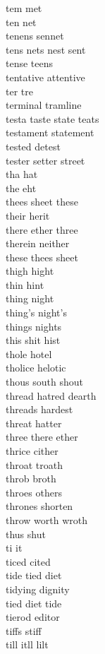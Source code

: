 tem met\\
ten net\\
tenens sennet\\
tens nets nest sent\\
tense teens\\
tentative attentive\\
ter tre\\
terminal tramline\\
testa taste state teats\\
testament statement\\
tested detest\\
tester setter street\\
tha hat\\
the eht\\
thees sheet these\\
their herit\\
there ether three\\
therein neither\\
these thees sheet\\
thigh hight\\
thin hint\\
thing night\\
thing's night's\\
things nights\\
this shit hist\\
thole hotel\\
tholice helotic\\
thous south shout\\
thread hatred dearth\\
threads hardest\\
threat hatter\\
three there ether\\
thrice cither\\
throat troath\\
throb broth\\
throes others\\
thrones shorten\\
throw worth wroth\\
thus shut\\
ti it\\
ticed cited\\
tide tied diet\\
tidying dignity\\
tied diet tide\\
tierod editor\\
tiffs stiff\\
till itll lilt\\
